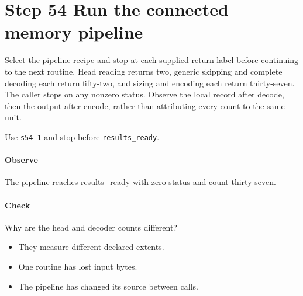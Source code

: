\section{Step 54 Run the connected memory pipeline}\label{cbor-s54}
Select the pipeline recipe and stop at each supplied return label before continuing to the next routine. Head reading returns two, generic skipping and complete decoding each return fifty-two, and sizing and encoding each return thirty-seven. The caller stops on any nonzero status. Observe the local record after decode, then the output after encode, rather than attributing every count to the same unit.

Use \texttt{s54-1} and stop before \texttt{results\_ready}.

\paragraph{Observe} The pipeline reaches results\_ready with zero status and count thirty-seven.

\paragraph{Check} Why are the head and decoder counts different?
\begin{itemize}
\item[A.] They measure different declared extents.
\item[B.] One routine has lost input bytes.
\item[C.] The pipeline has changed its source between calls.
\end{itemize}
